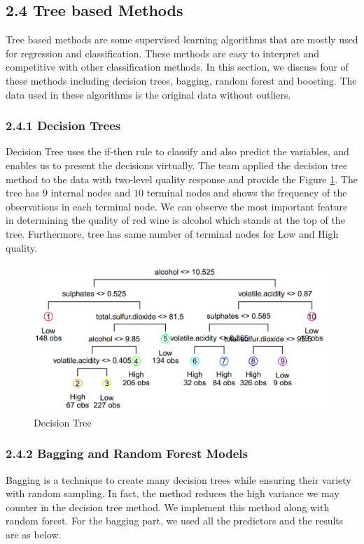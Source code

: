 \documentclass{article}
\begin{document}
\subsection{2.4  Tree based Methods}
Tree based methods are some supervised learning algorithms that are mostly used for regression and classification. These methods are easy to interpret and competitive with other classification methods. In this section, we discuss four of these methods including decision trees, bagging, random forest and boosting. The data used in these algorithms is the original data without outliers.
\subsubsection{2.4.1  Decision Trees}
Decision Tree uses the if-then rule to classify and also predict the variables, and enables us to present the decisions virtually. The team applied the decision tree method to the data with two-level quality response and provide the Figure \ref{Tree}. The tree has $9$ internal nodes and $10$ terminal nodes and shows the frequency of the observations in each terminal node. We can observe the most important feature in determining the quality of red wine is alcohol which stands at the top of the tree. Furthermore, tree has same number of terminal nodes for Low and High quality.
\begin{figure}[H]
    \centering
    \includegraphics[scale=0.55]{Tree-Method.PNG}
    \caption{Decision Tree}
    \label{Tree}
\end{figure}
\subsubsection{2.4.2  Bagging and Random Forest Models}

Bagging is a technique to create many decision trees while ensuring their variety with random sampling. In fact, the method reduces the high variance we may counter in the decision tree method. We implement this method along with random forest. For the bagging part, we used all the predictors and the results are as below.
\end{document}

